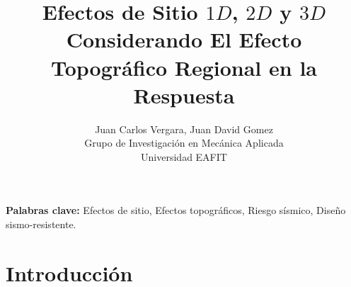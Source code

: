 \documentclass[spanish,letterpaper,12pt,twoside,openany]{article}
\title{\Large{Efectos de Sitio $1D$, $2D$ y $3D$ Considerando El Efecto Topográfico Regional en la Respuesta}}
\author{Juan Carlos Vergara, Juan David Gomez\\
Grupo de Investigación en Mecánica Aplicada\\
 Universidad EAFIT}
\begin{document}
%
%
%
%
%
\renewcommand{\tablename}{Tabla}
\renewcommand{\figurename}{Figura}
\renewcommand{\contentsname}{Tabla de contenido}
\renewcommand{\listtablename}{Lista de tablas}
\renewcommand{\listfigurename}{Lista de figuras}
\newcommand{\ask}{\textquestiondown}

\maketitle

{\bf Palabras clave:} Efectos de sitio, Efectos topográficos, Riesgo sísmico, Diseño sismo-resistente.
\newpage
{}
\tableofcontents
\listoffigures
%
%
\newpage
%
\section{Introducción}
%
\end{document}
